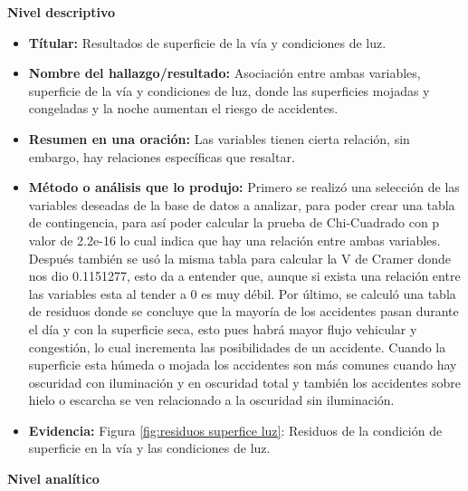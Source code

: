 \documentclass[12pt]{article}
\begin{document}
\textbf{Nivel descriptivo}
\begin{itemize}
    \item \textbf{Títular:} Resultados de superficie de la vía y condiciones de luz.
    
    \item \textbf{Nombre del hallazgo/resultado:}  Asociación entre ambas variables, superficie de la vía y condiciones de luz, donde las superficies 
    mojadas y congeladas y la noche aumentan el riesgo de accidentes.
    
    
    \item \textbf{Resumen en una oración:}  Las variables tienen cierta relación, sin embargo, hay relaciones específicas que resaltar.
    
    \item \textbf{Método o análisis que lo produjo:} Primero se realizó una selección de las variables deseadas de la base
    de datos a analizar, para poder crear una tabla de contingencia, para así poder calcular 
    la prueba de Chi-Cuadrado con p valor de 2.2e-16 lo cual indica que hay una relación 
    entre ambas variables. Después también se usó la misma tabla para calcular la V de 
    Cramer donde nos dio 0.1151277, esto da a entender que, aunque si exista una relación 
    entre las variables esta al tender a 0 es muy débil. Por último, se calculó una tabla
    de residuos donde se concluye que la mayoría de los accidentes pasan durante el día y 
    con la superficie seca, esto pues habrá mayor flujo vehicular y congestión, lo cual incrementa las posibilidades 
    de un accidente. Cuando la superficie esta húmeda o mojada los accidentes son más comunes cuando hay oscuridad con iluminación 
    y en oscuridad total y también los accidentes sobre hielo o escarcha se ven relacionado a la oscuridad sin iluminación. 
    
    \item \textbf{Evidencia:} Figura \ref{fig:residuos superfice luz}: Residuos 
    de la condición de superficie en la vía y las condiciones de luz.\\

\end{itemize}

\textbf{Nivel analítico}
\end{document}
